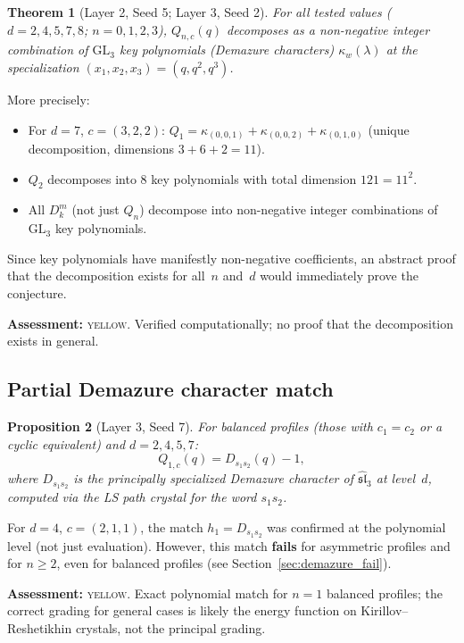 \documentclass[11pt]{article}
\newtheorem{theorem}{Theorem}[section]
\newtheorem{proposition}[theorem]{Proposition}
\theoremstyle{definition}
\begin{document}
\begin{theorem}[Layer 2, Seed 5; Layer 3, Seed 2]\label{thm:keypoly}
For all tested values ($d = 2, 4, 5, 7, 8$; $n = 0, 1, 2, 3$), $Q_{n,c}(q)$ decomposes as a non-negative integer combination of $\mathrm{GL}_3$ key polynomials (Demazure characters) $\kappa_w(\lambda)$ at the specialization $(x_1, x_2, x_3) = (q, q^2, q^3)$.
\end{theorem}

\noindent More precisely:
\begin{itemize}
\item For $d = 7$, $c = (3,2,2)$: $Q_1 = \kappa_{(0,0,1)} + \kappa_{(0,0,2)} + \kappa_{(0,1,0)}$ (unique decomposition, dimensions $3 + 6 + 2 = 11$).
\item $Q_2$ decomposes into 8 key polynomials with total dimension $121 = 11^2$.
\item All $D_k^m$ (not just $Q_n$) decompose into non-negative integer combinations of $\mathrm{GL}_3$ key polynomials.
\end{itemize}

\noindent Since key polynomials have manifestly non-negative coefficients, an abstract proof that the decomposition exists for all~$n$ and~$d$ would immediately prove the conjecture.

\noindent\textbf{Assessment:} \textsc{yellow}. Verified computationally; no proof that the decomposition exists in general.

\subsection{Partial Demazure character match}\label{sec:demazure}

\begin{proposition}[Layer 3, Seed 7]\label{prop:demazure}
For balanced profiles (those with $c_1 = c_2$ or a cyclic equivalent) and $d = 2, 4, 5, 7$:
\[
Q_{1,c}(q) = D_{s_1 s_2}(q) - 1,
\]
where $D_{s_1 s_2}$ is the principally specialized Demazure character of $\widehat{\mathfrak{sl}}_3$ at level~$d$, computed via the LS path crystal for the word $s_1 s_2$.
\end{proposition}

\noindent For $d = 4$, $c = (2,1,1)$, the match $h_1 = D_{s_1 s_2}$ was confirmed at the polynomial level (not just evaluation). However, this match \textbf{fails} for asymmetric profiles and for $n \geq 2$, even for balanced profiles (see Section~\ref{sec:demazure_fail}).

\noindent\textbf{Assessment:} \textsc{yellow}. Exact polynomial match for $n = 1$ balanced profiles; the correct grading for general cases is likely the energy function on Kirillov--Reshetikhin crystals, not the principal grading.
\end{document}
